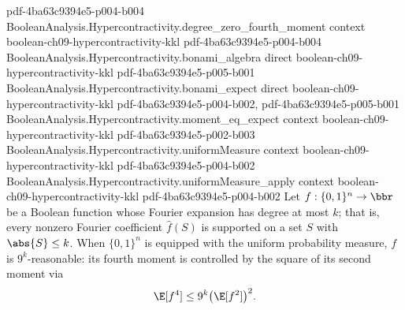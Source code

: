 \begin{lemma}
  {pdf-4ba63c9394e5-p004-b004}
\proofstep
  {BooleanAnalysis.Hypercontractivity.degree_zero_fourth_moment}
  {context}
  {boolean-ch09-hypercontractivity-kkl}
  {pdf-4ba63c9394e5-p004-b004}
\proofstep
  {BooleanAnalysis.Hypercontractivity.bonami_algebra}
  {direct}
  {boolean-ch09-hypercontractivity-kkl}
  {pdf-4ba63c9394e5-p005-b001}
\proofstep
  {BooleanAnalysis.Hypercontractivity.bonami_expect}
  {direct}
  {boolean-ch09-hypercontractivity-kkl}
  {pdf-4ba63c9394e5-p004-b002,
    pdf-4ba63c9394e5-p005-b001}
\proofstep
  {BooleanAnalysis.Hypercontractivity.moment_eq_expect}
  {context}
  {boolean-ch09-hypercontractivity-kkl}
  {pdf-4ba63c9394e5-p002-b003}
\proofstep
  {BooleanAnalysis.Hypercontractivity.uniformMeasure}
  {context}
  {boolean-ch09-hypercontractivity-kkl}
  {pdf-4ba63c9394e5-p004-b002}
\proofstep
  {BooleanAnalysis.Hypercontractivity.uniformMeasure_apply}
  {context}
  {boolean-ch09-hypercontractivity-kkl}
  {pdf-4ba63c9394e5-p004-b002}
Let $f : \{0,1\}^n \to \bbr$ be a Boolean function whose Fourier expansion has degree at
most $k$; that is, every nonzero Fourier coefficient $\hat f(S)$ is supported on a set
$S$ with $\abs{S} \le k$. When $\{0,1\}^n$ is equipped with the uniform probability
measure, $f$ is $9^k$-reasonable: its fourth moment is controlled by the square of its
second moment via
\[
\E[f^4] \le 9^k \bigl(\E[f^2]\bigr)^2 .
\]
\end{lemma}
